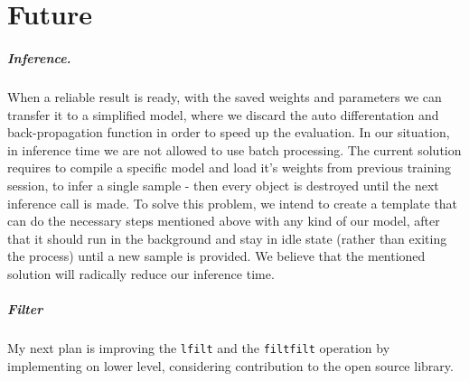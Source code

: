 \chapter{Future}

\paragraph{Inference.}
When a reliable result is ready, with the saved weights and parameters we can transfer it to a simplified model, where we discard the auto differentation and back-propagation function in order to speed up the evaluation.
In our situation, in inference time we are not allowed to use batch processing.
The current solution requires to compile a specific model and load it's weights from previous training session, to infer a single sample - then every object is destroyed until the next inference call is made.
To solve this problem, we intend to create a template that can do the necessary steps mentioned above with any kind of our model, after that it should run in the background and stay in idle state (rather than exiting the process) until a new sample is provided.
We believe that the mentioned solution will radically reduce our inference time.

\paragraph{Filter}
My next plan is improving the \texttt{lfilt} and the \texttt{filtfilt} operation by implementing on lower level, considering contribution to the open source library.
